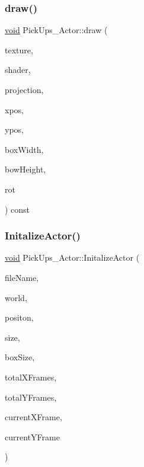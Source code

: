 \subsubsection{\texorpdfstring{draw()}{draw()}\hspace{0.1cm}{\footnotesize\ttfamily [2/2]}}
{\footnotesize\ttfamily \hyperlink{imgui__impl__opengl3__loader_8h_ac668e7cffd9e2e9cfee428b9b2f34fa7}{void} Pick\+Ups\+\_\+\+Actor\+::draw (\begin{DoxyParamCaption}\item[{\hyperlink{classTexture__Actor}{Texture\+\_\+\+Actor} $\ast$}]{texture,  }\item[{std\+::shared\+\_\+ptr$<$ \hyperlink{classShader__Actor}{Shader\+\_\+\+Actor} $>$}]{shader,  }\item[{glm\+::mat4}]{projection,  }\item[{float}]{xpos,  }\item[{float}]{ypos,  }\item[{float}]{box\+Width,  }\item[{float}]{bow\+Height,  }\item[{float}]{rot }\end{DoxyParamCaption}) const}

\mbox{\label{classPickUps__Actor_af465c835fb431671fa437b5bf209e51d}} 
\subsubsection{\texorpdfstring{Initalize\+Actor()}{InitalizeActor()}\hspace{0.1cm}{\footnotesize\ttfamily [1/2]}}
{\footnotesize\ttfamily \hyperlink{imgui__impl__opengl3__loader_8h_ac668e7cffd9e2e9cfee428b9b2f34fa7}{void} Pick\+Ups\+\_\+\+Actor\+::\+Initalize\+Actor (\begin{DoxyParamCaption}\item[{const char $\ast$}]{file\+Name,  }\item[{b2\+World $\ast$}]{world,  }\item[{glm\+::vec2}]{positon,  }\item[{glm\+::vec2}]{size,  }\item[{glm\+::vec2}]{box\+Size,  }\item[{int}]{total\+X\+Frames,  }\item[{int}]{total\+Y\+Frames,  }\item[{int}]{current\+X\+Frame,  }\item[{int}]{current\+Y\+Frame }\end{DoxyParamCaption})}

